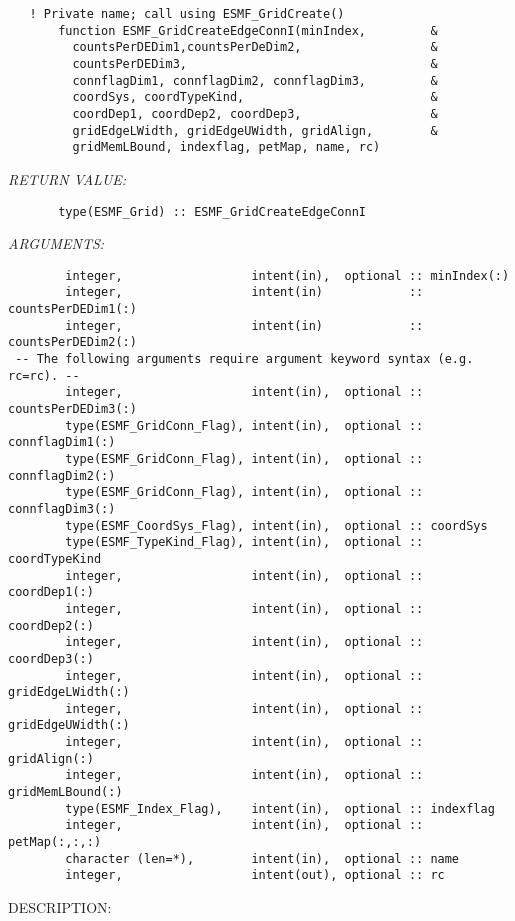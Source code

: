  
\begin{verbatim}   ! Private name; call using ESMF_GridCreate()
       function ESMF_GridCreateEdgeConnI(minIndex,         &
         countsPerDEDim1,countsPerDeDim2,                  &
         countsPerDEDim3,                                  &
         connflagDim1, connflagDim2, connflagDim3,         &
         coordSys, coordTypeKind,                          &
         coordDep1, coordDep2, coordDep3,                  &
         gridEdgeLWidth, gridEdgeUWidth, gridAlign,        &
         gridMemLBound, indexflag, petMap, name, rc)\end{verbatim}{\em RETURN VALUE:}
\begin{verbatim}       type(ESMF_Grid) :: ESMF_GridCreateEdgeConnI\end{verbatim}{\em ARGUMENTS:}
\begin{verbatim}        integer,                  intent(in),  optional :: minIndex(:)
        integer,                  intent(in)            :: countsPerDEDim1(:)
        integer,                  intent(in)            :: countsPerDEDim2(:)
 -- The following arguments require argument keyword syntax (e.g. rc=rc). --
        integer,                  intent(in),  optional :: countsPerDEDim3(:)
        type(ESMF_GridConn_Flag), intent(in),  optional :: connflagDim1(:)
        type(ESMF_GridConn_Flag), intent(in),  optional :: connflagDim2(:)
        type(ESMF_GridConn_Flag), intent(in),  optional :: connflagDim3(:)
        type(ESMF_CoordSys_Flag), intent(in),  optional :: coordSys
        type(ESMF_TypeKind_Flag), intent(in),  optional :: coordTypeKind
        integer,                  intent(in),  optional :: coordDep1(:)
        integer,                  intent(in),  optional :: coordDep2(:)
        integer,                  intent(in),  optional :: coordDep3(:)
        integer,                  intent(in),  optional :: gridEdgeLWidth(:)
        integer,                  intent(in),  optional :: gridEdgeUWidth(:)
        integer,                  intent(in),  optional :: gridAlign(:)
        integer,                  intent(in),  optional :: gridMemLBound(:)
        type(ESMF_Index_Flag),    intent(in),  optional :: indexflag
        integer,                  intent(in),  optional :: petMap(:,:,:)
        character (len=*),        intent(in),  optional :: name
        integer,                  intent(out), optional :: rc\end{verbatim}
{\sf DESCRIPTION:\\ }


